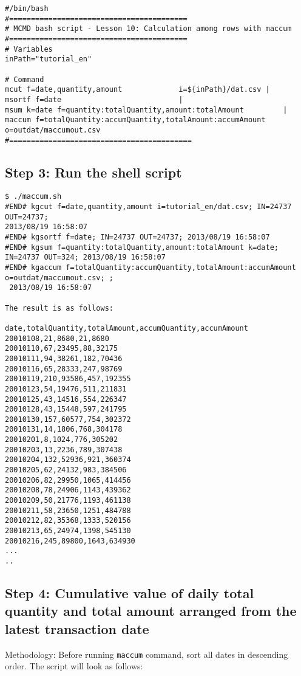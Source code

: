 \begin{verbatim}
#/bin/bash
#=========================================
# MCMD bash script - Lesson 10: Calculation among rows with maccum
#=========================================
# Variables
inPath="tutorial_en"

# Command 
mcut f=date,quantity,amount             i=${inPath}/dat.csv |
msortf f=date                           |
msum k=date f=quantity:totalQuantity,amount:totalAmount         |
maccum f=totalQuantity:accumQuantity,totalAmount:accumAmount o=outdat/maccumout.csv
#==========================================
\end{verbatim}

\subsection{Step 3: Run the shell script }

\begin{verbatim}
$ ./maccum.sh
#END# kgcut f=date,quantity,amount i=tutorial_en/dat.csv; IN=24737 OUT=24737; 
2013/08/19 16:58:07
#END# kgsortf f=date; IN=24737 OUT=24737; 2013/08/19 16:58:07
#END# kgsum f=quantity:totalQuantity,amount:totalAmount k=date; IN=24737 OUT=324; 2013/08/19 16:58:07
#END# kgaccum f=totalQuantity:accumQuantity,totalAmount:accumAmount o=outdat/maccumout.csv; ;
 2013/08/19 16:58:07

The result is as follows: 

date,totalQuantity,totalAmount,accumQuantity,accumAmount
20010108,21,8680,21,8680
20010110,67,23495,88,32175
20010111,94,38261,182,70436
20010116,65,28333,247,98769
20010119,210,93586,457,192355
20010123,54,19476,511,211831
20010125,43,14516,554,226347
20010128,43,15448,597,241795
20010130,157,60577,754,302372
20010131,14,1806,768,304178
20010201,8,1024,776,305202
20010203,13,2236,789,307438
20010204,132,52936,921,360374
20010205,62,24132,983,384506
20010206,82,29950,1065,414456
20010208,78,24906,1143,439362
20010209,50,21776,1193,461138
20010211,58,23650,1251,484788
20010212,82,35368,1333,520156
20010213,65,24974,1398,545130
20010216,245,89800,1643,634930
...
..
\end{verbatim}

\subsection{Step 4: Cumulative value of daily total quantity and total amount arranged from the latest transaction date }

Methodology: Before running \verb|maccum| command, sort all dates in descending order. The script will look as follows:

